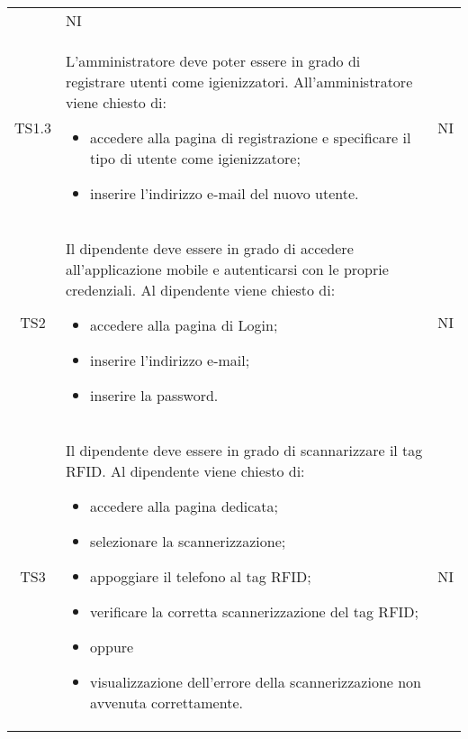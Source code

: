{\begin{longtable}{ c C{11cm} c }
\begin{itemize}
        \end{itemize}&
        NI\\

        TS1.3&
        \begin{flushleft}
            L'amministratore deve poter essere in grado di registrare utenti come igienizzatori.
            All'amministratore viene chiesto di:
        \end{flushleft}
        \begin{itemize}
            \item accedere alla pagina di registrazione e specificare il tipo di utente come igienizzatore;
            \item inserire l'indirizzo e-mail del nuovo utente.
            
        \end{itemize}&
        NI\\

        TS2&
        \begin{flushleft}
             Il dipendente deve essere in grado di accedere all'applicazione mobile e autenticarsi con le proprie credenziali.
             Al dipendente viene chiesto di:
        \end{flushleft}
        \begin{itemize}
            \item accedere alla pagina di Login;
            \item inserire l'indirizzo e-mail;
            \item inserire la password.
        \end{itemize}&
        NI\\

        TS3&
        \begin{flushleft}
            Il dipendente deve essere in grado di scannarizzare il tag RFID.
            Al dipendente viene chiesto di:
        \end{flushleft}
        \begin{itemize}
            \item accedere alla pagina dedicata;
            \item selezionare la scannerizzazione;
            \item appoggiare il telefono al tag RFID;
            \item verificare la corretta scannerizzazione del tag RFID;
            \item [] oppure
            \item visualizzazione dell'errore della scannerizzazione non avvenuta correttamente.
        \end{itemize}&
        NI\\


\end{longtable}}
